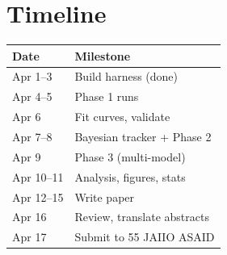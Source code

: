 \documentclass[11pt]{article}
\begin{document}
\section{Timeline}

\begin{tabular}{@{} l l @{}}
\toprule
\textbf{Date} & \textbf{Milestone} \\
\midrule
Apr 1--3 & Build harness (done) \\
Apr 4--5 & Phase 1 runs \\
Apr 6 & Fit curves, validate \\
Apr 7--8 & Bayesian tracker + Phase 2 \\
Apr 9 & Phase 3 (multi-model) \\
Apr 10--11 & Analysis, figures, stats \\
Apr 12--15 & Write paper \\
Apr 16 & Review, translate abstracts \\
Apr 17 & Submit to 55 JAIIO ASAID \\
\bottomrule
\end{tabular}
\end{document}
